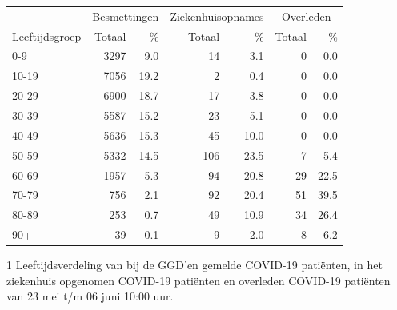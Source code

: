 \documentclass[
  english,
  man,floatsintext]{apa6}
\begin{document}
\begin{table}
\centering\begingroup\fontsize{11}{13}\selectfont

\begin{threeparttable}
\begin{tabular}{lrrrrrr}
\toprule
\multicolumn{1}{c}{ } & \multicolumn{2}{c}{Besmettingen} & \multicolumn{2}{c}{Ziekenhuisopnames} & \multicolumn{2}{c}{Overleden} \\
\cmidrule(l{3pt}r{3pt}){2-3} \cmidrule(l{3pt}r{3pt}){4-5} \cmidrule(l{3pt}r{3pt}){6-7}
Leeftijdsgroep & Totaal & \% & Totaal & \% & Totaal & \%\\
\midrule
0-9 & 3297 & 9.0 & 14 & 3.1 & 0 & 0.0\\
10-19 & 7056 & 19.2 & 2 & 0.4 & 0 & 0.0\\
20-29 & 6900 & 18.7 & 17 & 3.8 & 0 & 0.0\\
30-39 & 5587 & 15.2 & 23 & 5.1 & 0 & 0.0\\
40-49 & 5636 & 15.3 & 45 & 10.0 & 0 & 0.0\\
50-59 & 5332 & 14.5 & 106 & 23.5 & 7 & 5.4\\
60-69 & 1957 & 5.3 & 94 & 20.8 & 29 & 22.5\\
70-79 & 756 & 2.1 & 92 & 20.4 & 51 & 39.5\\
80-89 & 253 & 0.7 & 49 & 10.9 & 34 & 26.4\\
90+ & 39 & 0.1 & 9 & 2.0 & 8 & 6.2\\
\bottomrule
\end{tabular}
\begin{tablenotes}
\item[1] Leeftijdsverdeling van bij de GGD’en gemelde COVID-19 patiënten, in het ziekenhuis opgenomen COVID-19 patiënten en overleden COVID-19 patiënten van 23 mei t/m 06 juni 10:00 uur.
\end{tablenotes}
\end{threeparttable}
\endgroup{}
\end{table}

\newpage
\end{document}

